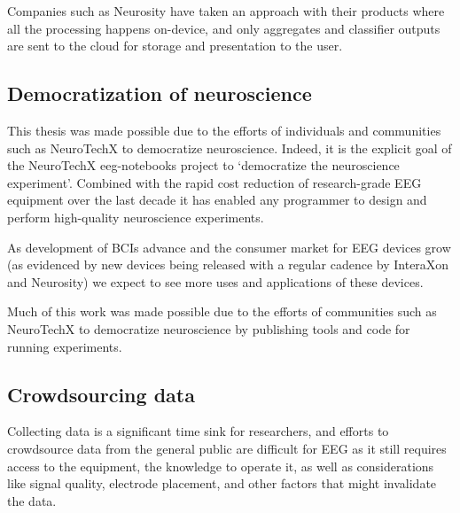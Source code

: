     Companies such as Neurosity have taken an approach with their products where all the processing happens on-device, and only aggregates and classifier outputs are sent to the cloud for storage and presentation to the user.



\subsection{Democratization of neuroscience}


    This thesis was made possible due to the efforts of individuals and communities such as NeuroTechX to democratize neuroscience. Indeed, it is the explicit goal of the NeuroTechX eeg-notebooks project to `democratize the neuroscience experiment'. Combined with the rapid cost reduction of research-grade EEG equipment over the last decade it has enabled any programmer to design and perform high-quality neuroscience experiments.


    As development of BCIs advance and the consumer market for EEG devices grow (as evidenced by new devices being released with a regular cadence by InteraXon and Neurosity) we expect to see more uses and applications of these devices.

    Much of this work was made possible due to the efforts of communities such as NeuroTechX to democratize neuroscience by publishing tools and code for running experiments.

\subsection{Crowdsourcing data}

    Collecting data is a significant time sink for researchers, and efforts to crowdsource data from the general public are difficult for EEG as it still requires access to the equipment, the knowledge to operate it, as well as considerations like signal quality, electrode placement, and other factors that might invalidate the data.

